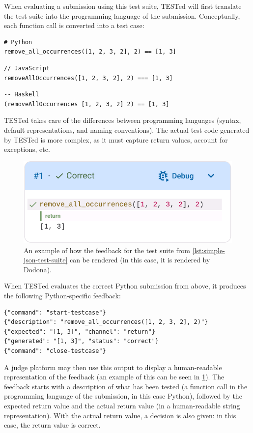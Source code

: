 \documentclass[../main]{subfiles}
\begin{document}
When evaluating a submission using this test suite, TESTed will first translate the test suite into the programming language of the submission.
Conceptually, each function call is converted into a test case:

\begin{verbatim}
# Python
remove_all_occurrences([1, 2, 3, 2], 2) == [1, 3]
\end{verbatim}

\begin{verbatim}
// JavaScript
removeAllOccurrences([1, 2, 3, 2], 2) === [1, 3]
\end{verbatim}

\begin{verbatim}
-- Haskell
(removeAllOccurrences [1, 2, 3, 2] 2) == [1, 3]
\end{verbatim}

TESTed takes care of the differences between programming languages (syntax, default representations, and naming conventions).
The actual test code generated by TESTed is more complex, as it must capture return values, account for exceptions, etc.

\begin{figure}
    \centering
    \includegraphics[width=0.5\linewidth]{dodona-rendering-small}
    \caption{An example of how the feedback for the test suite from \cref{lst:simple-json-test-suite} can be rendered (in this case, it is rendered by Dodona).}
    \label{fig:dodona-rendering-small}
\end{figure}

When TESTed evaluates the correct Python submission from above, it produces the following Python-specific feedback:

\begin{verbatim}
{"command": "start-testcase"}
{"description": "remove_all_occurrences([1, 2, 3, 2], 2)"}
{"expected": "[1, 3]", "channel": "return"}
{"generated": "[1, 3]", "status": "correct"}
{"command": "close-testcase"}
\end{verbatim}

A judge platform may then use this output to display a human-readable representation of the feedback (an example of this can be seen in \cref{fig:dodona-rendering-small}).
The feedback starts with a description of what has been tested (a function call in the programming language of the submission, in this case Python), followed by the expected return value and the actual return value (in a human-readable string representation).
With the actual return value, a decision is also given: in this case, the return value is correct.
\end{document}
